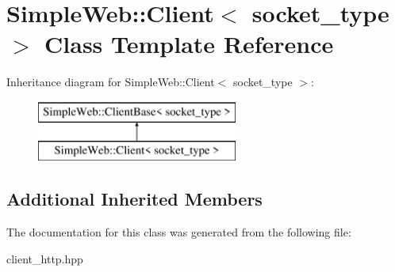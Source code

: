 \hypertarget{a01908}{}\section{Simple\+Web\+:\+:Client$<$ socket\+\_\+type $>$ Class Template Reference}
\label{a01908}
Inheritance diagram for Simple\+Web\+:\+:Client$<$ socket\+\_\+type $>$\+:\begin{figure}[H]
\begin{center}
\leavevmode
\includegraphics[height=2.000000cm]{a01908}
\end{center}
\end{figure}
\subsection*{Additional Inherited Members}


The documentation for this class was generated from the following file\+:\begin{DoxyCompactItemize}
\item 
client\+\_\+http.\+hpp\end{DoxyCompactItemize}
